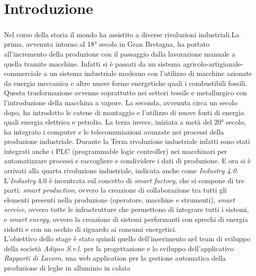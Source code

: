 \chapter*{Introduzione}
    \label{introduzione}
    \paragraph{}
    Nel corso della storia il mondo ha assistito a diverse rivoluzioni industriali.La prima,
    avvenuta intorno al 18° secolo in Gran Bretagna, ha portato all'incremento della produzione
    con il passaggio dalla lavorazione manuale a quella tramite macchine. Infatti si è passati da un
    sistema agricolo-artigianale-commerciale a un sistema industriale moderno con l'utilizzo di macchine
    azionate da energia meccanica e altre nuove forme energetiche quali i combustibili fossili. 
    Questa trasformazione avvenne soprattutto nei settori tessile e metallurgico con l'introduzione
    della macchina a vapore.
    La seconda, avvenuta circa un secolo dopo, ha introdotto le catene di montaggio e l'utilizzo di nuove fonti di energia quali
    energia elettrica e petrolio.
    La terza invece, iniziata a metà del 20° secolo, ha integrato i computer e le telecomuniazioni avanzate
    nei processi della produzione industriale. Durante la Terza rivoluzione industriale infatti
    sono stati integrati anche i PLC (programmable logic controller) nei macchinari per automatizzare
    processi e raccogliere e condividere i dati di produzione. E ora si è arrivati alla quarta rivoluzione
    industriale, indicata anche come \textit{Industry 4.0}.\\
    L'\textit{Industry} 4.0 è incentrata sul concetto di \textit{smart factory}, che si compone di tre parti: \textit{smart 
    production}, ovvero la creazione di collaborazione tra tutti gli elementi presenti nella produzione
    (operatore, macchine e strumenti), \textit{smart service}, ovvero tutte le infrastrutture
    che permettono di integrare tutti i sistemi, e \textit{smart energy}, ovvero la creazione di sistemi performanti
    con sprechi di energia ridotti e con un occhio di riguardo ai consumi energetici.\\
    L'obiettivo dello stage è stato quindi quello dell'inserimento nel team di sviluppo della società
    \textit{Adipso S.r.l.} per la progettazione e lo sviluppo dell'applicativo \textit{Rapporti di Lavoro},
    una web application per la gestione automatica della produzione di leghe in alluminio in colata
